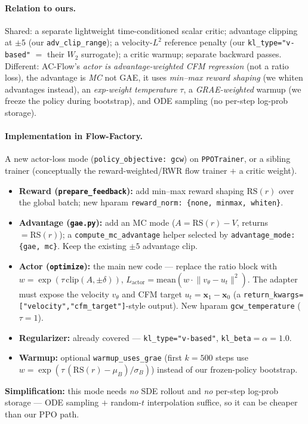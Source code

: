 \documentclass[11pt]{article}
\theoremstyle{remark}
\newcommand{\xt}{\bm{x}}
\begin{document}
\paragraph{Relation to ours.}
Shared: a separate lightweight time-conditioned scalar critic; advantage clipping at
$\pm 5$ (our \texttt{adv\_clip\_range}); a velocity-$L^2$ reference penalty (our
\texttt{kl\_type="v-based"} $=$ their $W_2$ surrogate); a critic warmup; separate
backward passes. Different: AC-Flow's \emph{actor is advantage-weighted CFM regression}
(not a ratio loss), the advantage is \emph{MC} not GAE, it uses \emph{min--max reward
shaping} (we whiten advantages instead), an \emph{exp-weight temperature} $\tau$, a
\emph{GRAE-weighted} warmup (we freeze the policy during bootstrap), and ODE sampling
(no per-step log-prob storage).

\paragraph{Implementation in Flow-Factory.}
A new actor-loss mode (\texttt{policy\_objective: gcw}) on \texttt{PPOTrainer}, or a
sibling trainer (conceptually the reward-weighted/RWR flow trainer $+$ a critic weight).
\begin{itemize}[leftmargin=1.6em]
  \item \textbf{Reward (\texttt{prepare\_feedback}):} add min--max reward shaping
  $\mathrm{RS}(r)$ over the global batch; new hparam \texttt{reward\_norm:
  \{none, minmax, whiten\}}.
  \item \textbf{Advantage (\texttt{gae.py}):} add an MC mode
  ($A=\mathrm{RS}(r)-V$, returns $=\mathrm{RS}(r)$); a
  \texttt{compute\_mc\_advantage} helper selected by \texttt{advantage\_mode:
  \{gae, mc\}}. Keep the existing $\pm 5$ advantage clip.
  \item \textbf{Actor (\texttt{optimize}):} the main new code --- replace the ratio block
  with $w=\exp(\tau\,\mathrm{clip}(A,\pm\delta))$,
  $L_{\mathrm{actor}}=\mathrm{mean}(w\cdot\lVert v_\theta-u_t\rVert^2)$. The adapter
  must expose the velocity $v_\theta$ and CFM target $u_t=\xt_1-\xt_0$ (a
  \texttt{return\_kwargs=["velocity","cfm\_target"]}-style output). New hparam
  \texttt{gcw\_temperature} ($\tau{=}1$).
  \item \textbf{Regularizer:} already covered --- \texttt{kl\_type="v-based"},
  \texttt{kl\_beta}$=\alpha=1.0$.
  \item \textbf{Warmup:} optional \texttt{warmup\_uses\_grae} (first $k{=}500$ steps use
  $w=\exp(\tau\,(\mathrm{RS}(r)-\mu_B)/\sigma_B)$) instead of our frozen-policy bootstrap.
\end{itemize}
\textbf{Simplification:} this mode needs \emph{no} SDE rollout and \emph{no} per-step
log-prob storage --- ODE sampling $+$ random-$t$ interpolation suffice, so it can be
cheaper than our PPO path.
\end{document}
